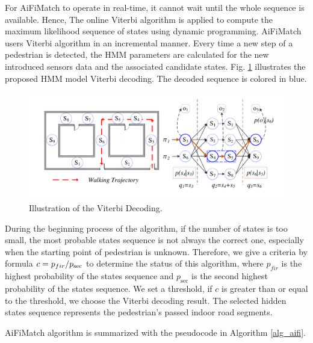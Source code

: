\documentclass{llncs}
\begin{document}
For AiFiMatch to operate in real-time, it cannot wait until the whole sequence is available. Hence, The online Viterbi algorithm \cite{bloit2008short} is applied to compute the maximum likelihood sequence of states using dynamic programming. AiFiMatch users Viterbi algorithm in an incremental manner. Every time a new step of a pedestrian is detected, the HMM parameters are calculated for the new introduced sensors data and the associated candidate states.  Fig. \ref{fig-viterbi} illustrates the proposed HMM model Viterbi decoding. The decoded sequence is colored in blue.

\begin{figure}[!htbp]
	\centering
	\includegraphics[width=4.6in]{AiFiMatch-Viterbi}
	\caption{Illustration of the Viterbi Decoding.}
	\label{fig-viterbi}
\end{figure}

During the beginning process of the algorithm, if the number of states is too small, the most probable states sequence is not always the correct one, especially when the starting point of pedestrian is unknown. Therefore, we give a criteria by formula $c = {{{p_{fir}}} \mathord{\left/
		{\vphantom {{{p_{fir}}} {{p_{\sec }}}}} \right.
		\kern-\nulldelimiterspace} {{p_{\sec }}}}$ to determine the status of this algorithm, where ${p_{fir}}$ is the highest probability of the states sequence and ${p_{\sec }}$ is the second highest probability of the states sequence. We set a threshold, if $c$ is greater than or equal to the threshold, we choose the Viterbi decoding result. The selected hidden states sequence represents the pedestrian's passed indoor road segments.

AiFiMatch algorithm is summarized with the pseudocode in Algorithm \ref{alg_aifi}.  
\end{document}
